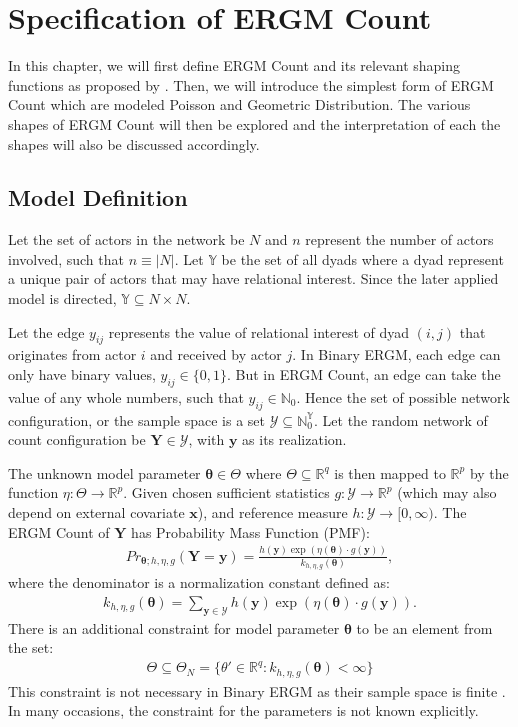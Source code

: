 \documentclass[12pt,a4paper,twoside,openany]{book}
\begin{document}



\chapter{Specification of ERGM Count}
In this chapter, we will first define ERGM Count and its relevant shaping functions as proposed by \citet{countergmdefined}. 
Then, we will introduce the simplest form of ERGM Count which are modeled Poisson and Geometric Distribution. 
The various shapes of ERGM Count will then be explored and the interpretation of each the shapes will also be discussed accordingly. 

\section{Model Definition}
Let the set of actors in the network be $N$ and $n$ represent the number of actors involved, such that $n \equiv |N|$.
Let $\mathbb{Y}$ be the set of all dyads where a dyad represent a unique pair of actors that may have relational interest. 
Since the later applied model is directed, $\mathbb{Y} \subseteq N \times N$. 

Let the edge $y_{ij}$ represents the value of relational interest of dyad $(i,j)$ that originates from actor $i$ and received by actor $j$.
In Binary ERGM, each edge can only have binary values, $y_{ij} \in \{0,1\}$. 
But in ERGM Count, an edge can take the value of any whole numbers, such that $y_{ij} \in \mathbb{N}_0$. 
Hence the set of possible network configuration, or the sample space is a set $\mathcal{Y} \subseteq \mathbb{N}_{0}^{\mathbb{Y}}$. 
Let the random network of count configuration be $\bm{Y} \in \mathcal{Y}$, with $\bm{y}$ as its realization.

The unknown model parameter $\bm{\theta} \in \Theta$ where $\Theta \subseteq \mathbb{R}^{q}$ is then mapped to $\mathbb{R}^p$ by the function $\eta:\Theta \to \mathbb{R}^p$. Given chosen sufficient statistics $g:\mathcal{Y} \to \mathbb{R}^{p}$ (which may also depend on external covariate $\bm{x}$), and reference measure $h:\mathcal{Y} \to [0,\infty)$. The ERGM Count of $\bm{Y}$ has Probability Mass Function (PMF):
\begin{align}
Pr_{\bm{\theta};h,\eta,g}(\bm{Y}=\bm{y})=\frac{h(\bm{y})\exp(\eta(\bm{\theta})\cdot g(\bm{y}))}{k_{h,\eta,g}(\bm{\theta})},
\end{align}
where the denominator is a normalization constant defined as:
\begin{align}
k_{h,\eta,g}(\bm{\theta}) = \sum_{\bm{y} \in \mathcal{Y}}h(\bm{y})\exp(\eta(\bm{\theta})\cdot g(\bm{y})).
\end{align}
There is an additional constraint for model parameter $\bm{\theta}$ to be an element from the set:
\begin{align} \label{eq: parameter constraint}
\Theta \subseteq \Theta_{N}=\{\theta' \in \mathbb{R}^q: k_{h,\eta,g}(\bm{\theta}) < \infty\}
\end{align}
This constraint is not necessary in Binary ERGM as their sample space is finite \citep{countergmdefined}. 
In many occasions, the constraint for the parameters is not known explicitly. 
\end{document}
